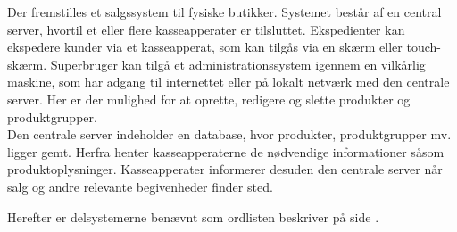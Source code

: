 Der fremstilles et salgssystem til fysiske butikker. Systemet består af en central server, hvortil et eller flere kasseapperater er tilsluttet. Ekspedienter kan ekspedere kunder via et kasseapperat, som kan tilgås via en skærm eller touch-skærm. Superbruger kan tilgå et administrationssystem igennem en vilkårlig maskine, som har adgang til internettet eller på lokalt netværk med den centrale server. Her er der mulighed for at oprette, redigere og slette produkter og produktgrupper.\\

Den centrale server indeholder en database, hvor produkter, produktgrupper mv. ligger gemt. Herfra henter kasseapperaterne de nødvendige informationer såsom produktoplysninger. Kasseapperater informerer desuden den centrale server når salg og andre relevante begivenheder finder sted.

Herefter er delsystemerne benævnt som ordlisten beskriver på side \pageref{glos}.